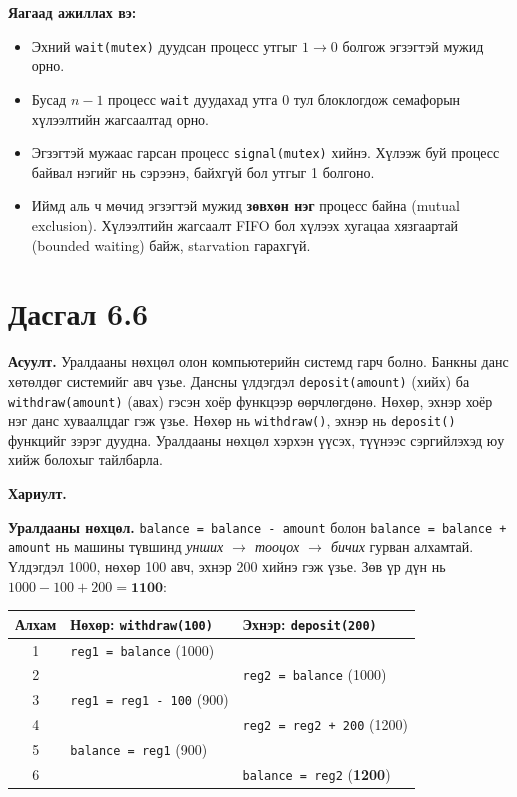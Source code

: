 \documentclass[12pt,a4paper]{article}
\newcommand{\question}[2]{\section{Дасгал #1}\textbf{Асуулт.} #2\par\medskip\textbf{Хариулт.}\par}
\begin{document}
\textbf{Яагаад ажиллах вэ:}
\begin{itemize}[leftmargin=1.5em]
  \item Эхний \texttt{wait(mutex)} дуудсан процесс утгыг $1 \to 0$ болгож эгзэгтэй мужид орно.
  \item Бусад $n-1$ процесс \texttt{wait} дуудахад утга 0 тул блоклогдож семафорын хүлээлтийн жагсаалтад орно.
  \item Эгзэгтэй мужаас гарсан процесс \texttt{signal(mutex)} хийнэ. Хүлээж буй процесс байвал нэгийг нь сэрээнэ, байхгүй бол утгыг 1 болгоно.
  \item Иймд аль ч мөчид эгзэгтэй мужид \textbf{зөвхөн нэг} процесс байна (mutual exclusion). Хүлээлтийн жагсаалт FIFO бол хүлээх хугацаа хязгаартай (bounded waiting) байж, starvation гарахгүй.
\end{itemize}

\question{6.6}{Уралдааны нөхцөл олон компьютерийн системд гарч болно. Банкны данс хөтөлдөг системийг авч үзье. Дансны үлдэгдэл \texttt{deposit(amount)} (хийх) ба \texttt{withdraw(amount)} (авах) гэсэн хоёр функцээр өөрчлөгдөнө. Нөхөр, эхнэр хоёр нэг данс хуваалцдаг гэж үзье. Нөхөр нь \texttt{withdraw()}, эхнэр нь \texttt{deposit()} функцийг зэрэг дуудна. Уралдааны нөхцөл хэрхэн үүсэх, түүнээс сэргийлэхэд юу хийж болохыг тайлбарла.}

\textbf{Уралдааны нөхцөл.} \texttt{balance = balance - amount} болон \texttt{balance = balance + amount} нь машины түвшинд \emph{унших $\to$ тооцох $\to$ бичих} гурван алхамтай. Үлдэгдэл 1000, нөхөр 100 авч, эхнэр 200 хийнэ гэж үзье. Зөв үр дүн нь $1000 - 100 + 200 = \mathbf{1100}$:

\begin{center}
\begin{tabular}{cll}\toprule
Алхам & Нөхөр: \texttt{withdraw(100)} & Эхнэр: \texttt{deposit(200)}\\\midrule
1 & \texttt{reg1 = balance} \quad (1000) & \\
2 & & \texttt{reg2 = balance} \quad (1000)\\
3 & \texttt{reg1 = reg1 - 100} \quad (900) & \\
4 & & \texttt{reg2 = reg2 + 200} \quad (1200)\\
5 & \texttt{balance = reg1} \quad (900) & \\
6 & & \texttt{balance = reg2} \quad (\textbf{1200})\\\bottomrule
\end{tabular}
\end{center}
\end{document}
